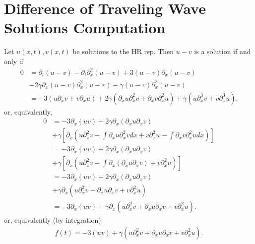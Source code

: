 \documentclass[12pt,reqno]{amsart}
\numberwithin{equation}{section}  %
\numberwithin{figure}{section}
\newcommand{\p}{\partial}
\theoremstyle{plain}  %
\theoremstyle{definition}
\begin{document}
\section{Difference of Traveling Wave Solutions Computation} 
\label{sec:dif-trav-wave-comp}
Let $u(x,t), v(x,t)$ be solutions to the HR ivp. Then $u -v$ is a solution if
and only if
%
%
\begin{equation*}
  \begin{split}
    0 & = \p_t(u -v) - \p_t \p_x^{2}(u -v) + 3(u-v)\p_x(u-v)
    \\
    & - 2 \gamma
    \p_x(u-v)\p_x^{2}(u-v) - \gamma (u-v)\p_x^{3}(u-v)
    \\
    & = -3(u \p_x v + v \p_x u) + 2\gamma(\p_x u \p_x^{2}v + \p_x v \p_x^2 u) +
    \gamma(u \p_x^3 v + v \p_x^3 u).
  \end{split}
\end{equation*}
%
%
or, equivalently,
%
%
\begin{equation*}
  \begin{split}
    0
    & = -3 \p_x(uv) + 2 \gamma \p_x\left( \p_x u \p_x v \right)
    \\
    & + \gamma \left[ \p_x(u \p_x^2v - \int \p_x u \p_x^2 v dx + v \p_x^2 u - \int
    \p_x v \p_x^2 u dx) \right]
    \\
    & = -3 \p_x(uv) + 2 \gamma \p_x (\p_x u \p_x v)
    \\
    & + \gamma\left[ \p_x (u \p_x^2 v - \int \p_x(\p_x u \p_x v) + v \p_x^2 u) \right]
    \\
    & = - 3 \p_x(uv) + 2 \gamma \p_x(\p_x u \p_xv)
    \\
    & + \gamma \p_x(u \p_x^2 v - \p_x u \p_x v + v \p_x^2 u)
    \\
    & = - 3 \p_x(uv) + \gamma \p_x(u \p_x^2 v + \p_x u \p_x v + v \p_x^2 u).
  \end{split}
\end{equation*}
%
%
or, equivalently (by integration)
%
%
%
\begin{equation*}
  \begin{split}
    f(t)=- 3 (uv) + \gamma (u \p_x^2 v + \p_x u \p_x v + v \p_x^2 u).
  \end{split}
\end{equation*}
%
%
%
%
%
%
%
%
%
%
%
\end{document}
